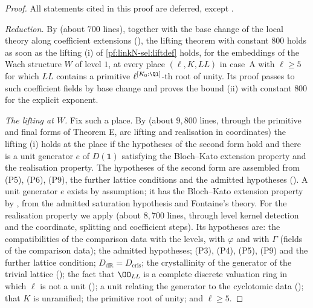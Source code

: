 \begin{proof}
All statements cited in this proof are deferred, except .

\emph{Reduction.} By  (about $700$ lines), together with the base change of
the local theory along coefficient extensions (), the lifting theorem with
constant $800$ holds as soon as the lifting (i) of \cref{pf:linkN-sel:liftdef} holds, for the embeddings of the Wach structure $W$ of level $1$, at
every place $(\ell,K,\mathit{LL})$ in case~A with $\ell\ge5$ for which $\mathit{LL}$ contains a primitive $\ell^{[K_0:\Ql]}$-th root of unity. Its proof
passes to such coefficient fields by base change and proves the bound (ii) with constant $800$ for the explicit exponent.

\emph{The lifting at $W$.} Fix such a place. By 
(about $9{,}800$ lines, through the primitive and final forms of Theorem E, arc lifting and realisation in coordinates) the lifting (i) holds
at the place if the hypotheses of the second form hold and there is a unit generator $e$ of $D(\mathbf 1)$ satisfying the Bloch--Kato extension property
and the realisation property. The hypotheses of the second form are assembled from (P5), (P6), (P9), the further lattice conditions and the
admitted hypotheses (). A unit generator $e$ exists by assumption; it has the
Bloch--Kato extension property by , from the admitted saturation hypothesis and Fontaine's theory. For
the realisation property we apply  (about $8{,}700$ lines, through level kernel detection
and the coordinate, splitting and coefficient steps). Its hypotheses are: the compatibilities of the comparison data with the levels, with
$\varphi$ and with $\Gamma$ (fields of the comparison data); the admitted hypotheses; (P3), (P4), (P5), (P9) and the further lattice condition;
$D_{\mathrm{dR}}=D_{\mathrm{cris}}$; the crystallinity of the generator of the trivial lattice
(); the fact that $\OO_{\mathit{LL}}$ is a complete discrete valuation ring in which
$\ell$ is not a unit (); a unit relating the generator to the cyclotomic data
(); that $K$ is unramified; the primitive root of unity; and $\ell\ge5$.
\end{proof}

